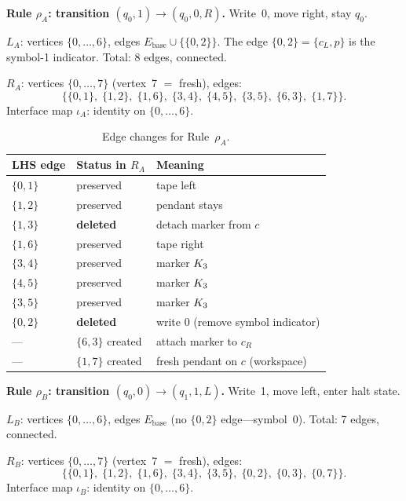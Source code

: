 \documentclass{../shared/primo}
\begin{document}
\textbf{Rule $\rho_A$: transition $(q_0, 1) \to (q_0, 0, R)$.} Write~0, move right, stay $q_0$.

$L_A$: vertices $\{0,\ldots,6\}$, edges $E_{\text{base}} \cup \{\{0,2\}\}$. The edge $\{0,2\} = \{c_L, p\}$ is the symbol-1 indicator. Total: 8 edges, connected.

$R_A$: vertices $\{0,\ldots,7\}$ (vertex~7 $=$ fresh), edges:
\[
\bigl\{\{0,1\},\; \{1,2\},\; \{1,6\},\; \{3,4\},\; \{4,5\},\; \{3,5\},\; \{6,3\},\; \{1,7\}\bigr\}.
\]
Interface map $\iota_A$: identity on $\{0,\ldots,6\}$.

\begin{table}[ht]
\centering
\begin{tabular}{lll}
\toprule
LHS edge & Status in $R_A$ & Meaning \\
\midrule
$\{0,1\}$ & preserved & tape left \\
$\{1,2\}$ & preserved & pendant stays \\
$\{1,3\}$ & \textbf{deleted} & detach marker from $c$ \\
$\{1,6\}$ & preserved & tape right \\
$\{3,4\}$ & preserved & marker $K_{3}$ \\
$\{4,5\}$ & preserved & marker $K_{3}$ \\
$\{3,5\}$ & preserved & marker $K_{3}$ \\
$\{0,2\}$ & \textbf{deleted} & write 0 (remove symbol indicator) \\
---      & $\{6,3\}$ created & attach marker to $c_R$ \\
---      & $\{1,7\}$ created & fresh pendant on $c$ (workspace) \\
\bottomrule
\end{tabular}
\caption{Edge changes for Rule~$\rho_A$.}
\label{tab:ruleA}
\end{table}

\textbf{Rule $\rho_B$: transition $(q_0, 0) \to (q_1, 1, L)$.} Write~1, move left, enter halt state.

$L_B$: vertices $\{0,\ldots,6\}$, edges $E_{\text{base}}$ (no $\{0,2\}$ edge---symbol~0). Total: 7 edges, connected.

$R_B$: vertices $\{0,\ldots,7\}$ (vertex~7 $=$ fresh), edges:
\[
\bigl\{\{0,1\},\; \{1,2\},\; \{1,6\},\; \{3,4\},\; \{3,5\},\; \{0,2\},\; \{0,3\},\; \{0,7\}\bigr\}.
\]
Interface map $\iota_B$: identity on $\{0,\ldots,6\}$.
\end{document}
